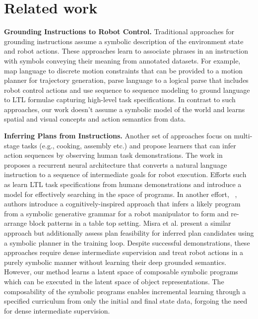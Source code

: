 \section{Related work}

\textbf{Grounding Instructions to Robot Control.} Traditional approaches for grounding instructions assume a symbolic description of the environment state 
and robot actions. 
%
These approaches learn to associate phrases in an instruction with symbols conveying their meaning from 
annotated datasets. 
%
For example, \cite{howard2014natural,paul2016efficient,tellex2011approaching} map language to discrete motion constraints that can be provided to a motion planner for trajectory generation, \cite{matuszek2013learning,knepper2013ikeabot} parse language to a logical parse that includes  robot control actions and \cite{gopalan2018sequence,williams2018learning} use sequence to sequence modeling to ground language to LTL formulae capturing high-level task specifications. 
%
In contrast to such approaches, our work doesn't assume a symbolic model of the world and learns spatial and visual concepts and action semantics from data. 

\textbf{Inferring Plans from Instructions.} Another set of approaches focus on multi-stage tasks (e.g., cooking, assembly etc.) and propose 
learners that can infer action sequences by observing human task demonstrations. 
%
The work in ~\cite{paxton2019prospection} proposes a recurrent neural architecture that converts a natural language instruction to a sequence of intermediate goals for robot execution. 
%
Efforts such as \cite{shah2018bayesian,wang2020learning,kress2008translating} learn LTL task specifications from humans demonstrations and introduce a model for effectively searching in the space of programs. 
%
In another effort, ~\cite{lazaro2019beyond}, authors introduce a cognitively-inspired approach that infers 
a likely program from a symbolic generative grammar for a robot manipulator to form and re-arrange block patterns
in a table top setting. 
%
Misra et al. \cite{misra2016tell} present a similar approach but additionally assess plan feasibility for inferred plan candidates 
using a symbolic planner in the training loop. 
%
Despite successful demonstrations, these approaches require dense  
intermediate supervision and treat robot actions in a purely symbolic manner without learning their deep grounded semantics. 
%
However, our method learns a latent space of composable symbolic programs which can be executed in the latent space of object representations. The composability of the  symbolic programs enables incremental learning through a specified curriculum from only the initial and final state data, forgoing the need for dense intermediate supervision. 


